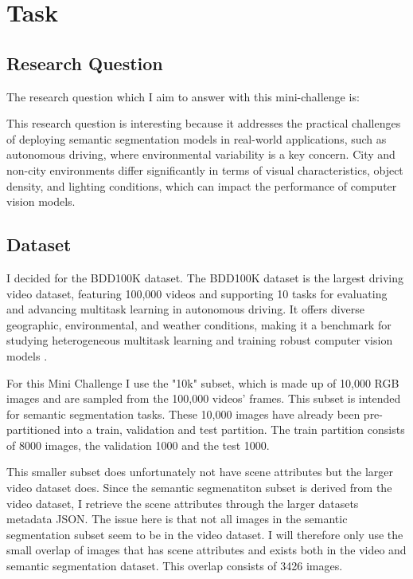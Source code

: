 \chapter{Task}

\section{Research Question}

The research question which I aim to answer with this mini-challenge is: 


This research question is interesting because it addresses the practical challenges of deploying semantic segmentation models in real-world applications, such as autonomous driving, where environmental variability is a key concern. City and non-city environments differ significantly in terms of visual characteristics, object density, and lighting conditions, which can impact the performance of computer vision models.

\section{Dataset}

I decided for the BDD100K dataset. The BDD100K dataset is the largest driving video dataset, featuring 100,000 videos and supporting 10 tasks for evaluating and advancing multitask learning in autonomous driving. It offers diverse geographic, environmental, and weather conditions, making it a benchmark for studying heterogeneous multitask learning and training robust computer vision models \cite{yuBDD100KDiverseDriving2020}. 

For this Mini Challenge I use the "10k" subset, which is made up of 10,000 RGB images and are sampled from the 100,000 videos' frames. This subset is intended for semantic segmentation tasks. These 10,000 images have already been pre-partitioned into a train, validation and test partition. The train partition consists of 8000 images, the validation 1000 and the test 1000.

This smaller subset does unfortunately not have scene attributes but the larger video dataset does. Since the semantic segmenatiton subset is derived from the video dataset, I retrieve the scene attributes through the larger datasets metadata JSON. The issue here is that not all images in the semantic segmentation subset seem to be in the video dataset. I will therefore only use the small overlap of images that has scene attributes and exists both in the video and semantic segmentation dataset. This overlap consists of 3426 images.

